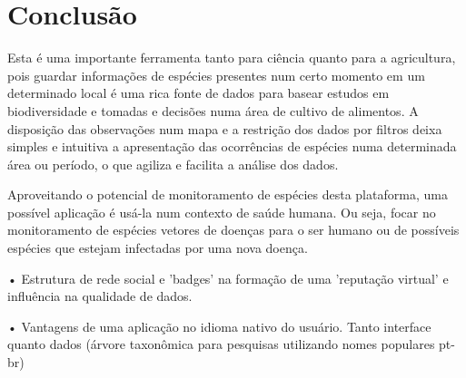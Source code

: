 \section*{Conclusão}

Esta é uma importante ferramenta tanto para ciência quanto para a agricultura, pois guardar informações de espécies presentes num certo momento em um determinado local é uma rica fonte de dados para basear estudos em biodiversidade e tomadas e decisões numa área de cultivo de alimentos. A disposição das observações num mapa e a restrição dos dados por filtros deixa simples e intuitiva a apresentação das ocorrências de espécies numa determinada área ou período, o que agiliza e facilita a análise dos dados.
  
Aproveitando o potencial de monitoramento de espécies desta plataforma, uma possível aplicação é usá-la num contexto de saúde humana. Ou seja, focar no monitoramento de espécies vetores de doenças para o ser humano ou de possíveis espécies que estejam infectadas por uma nova doença.
    
• Estrutura de rede social e 'badges' na formação de uma 'reputação virtual' e influência na qualidade de dados.
    
• Vantagens de uma aplicação no idioma nativo do usuário. Tanto interface quanto dados (árvore taxonômica para pesquisas utilizando nomes populares pt-br)